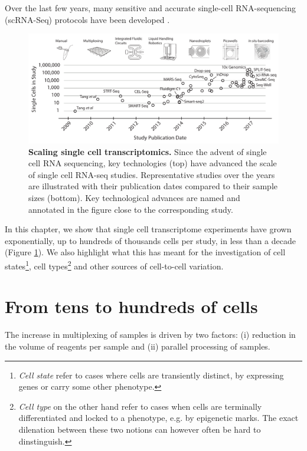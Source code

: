 Over the last few years, many sensitive and accurate single-cell RNA-sequencing
(scRNA-Seq) protocols have been developed \cite{Svensson2017-pf}.

\begin{figure}
    \centering
    \centerline{\includegraphics[width=\textwidth]{"main-figure"}}
    \caption[Scaling single cell transcriptomics]{\textbf{Scaling single cell transcriptomics.} Since the advent of single cell RNA sequencing, key technologies (top) have advanced the scale of single cell RNA-seq studies. Representative studies over the years are illustrated with their publication dates compared to their sample sizes (bottom). Key technological advances are named and annotated in the figure close to the corresponding study.}
    \label{fig:scaling}
\end{figure}

In this chapter, we show that single cell transcriptome experiments have grown exponentially, up to hundreds of thousands cells per study, in less than a decade (Figure \ref{fig:scaling}). We also highlight what this has meant for the investigation of cell states\footnote{\textit{Cell state} refer to cases where cells are transiently distinct, by expressing genes or carry some other phenotype.}, cell types\footnote{\textit{Cell type} on the other hand refer to cases when cells are terminally differentiated and locked to a phenotype, e.g. by epigenetic marks. The exact dilenation between these two notions can however often be hard to dinstinguish.} and other sources of cell-to-cell variation.

\section{From tens to hundreds of cells}

The increase in multiplexing of samples is driven by two factors: (i) reduction in the volume of reagents per sample and (ii) parallel processing of samples.

